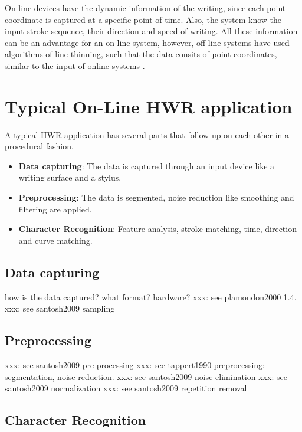 On-line devices have the dynamic information of the writing, since each point 
coordinate is captured at a specific point of time. Also, the system know the
input stroke sequence, their direction and speed of writing. All these 
information can be an advantage for an on-line system, however, off-line systems
have used algorithms of line-thinning, such that the data consits of point
coordinates, similar to the input of online systems .

\section{Typical On-Line HWR application}
\label{sec:typicalonlinehwrapplication}

A typical HWR application has several parts that follow up on each other in a
procedural fashion. 
\begin{itemize}
\item \textbf{Data capturing}: The data is captured through an input device 
  like a writing surface and a stylus.
\item \textbf{Preprocessing}: The data is segmented, noise reduction like smoothing and filtering are applied.
\item \textbf{Character Recognition}: Feature analysis, stroke matching, time, 
direction and curve matching.
\end{itemize}

\subsection{Data capturing}
\label{sec:datacapturing}

how is the data captured? what format?
hardware?
xxx: see plamondon2000 1.4.
xxx: see santosh2009 sampling

\subsection{Preprocessing}
\label{sec:preprocessing}

xxx: see santosh2009 pre-processing
xxx: see tappert1990 preprocessing: segmentation, noise reduction.
xxx: see santosh2009 noise elimination
xxx: see santosh2009 normalization
xxx: see santosh2009 repetition removal

\subsection{Character Recognition}
\label{sec:characterrecognition}

